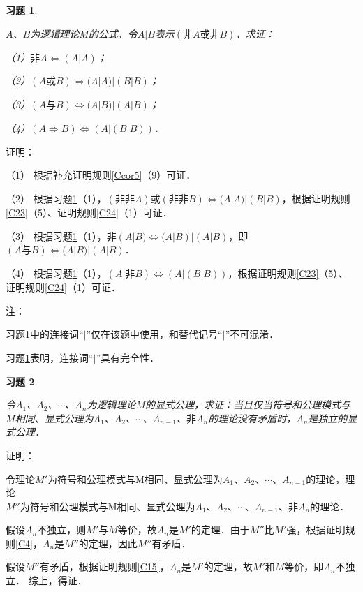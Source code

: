 \documentclass[12pt, a4paper, oneside]{book}
\newtheorem{exer}{习题}
\begin{document}
			\begin{exer}\label{exer11}
				\hfill\par
				$A$、$B$为逻辑理论$M$的公式，令$A|B$表示$(\text{非}A\text{或}\text{非}B)$，求证：
				\par
				（1）$\text{非}A\Leftrightarrow (A|A)$；
				\par
				（2）$(A\text{或}B)\Leftrightarrow (A|A)|(B|B)$；
				\par
				（3）$(A\text{与}B)\Leftrightarrow (A|B)|(A|B)$；
				\par
				（4）$(A\Rightarrow B)\Leftrightarrow (A|(B|B))$．
			\end{exer}
			证明：
			\par
			（1）	根据补充证明规则\ref{Ccor5}（9）可证．
			\par
			（2）	根据习题\ref{exer11}（1），$(\text{非}\text{非}A)\text{或}(\text{非}\text{非}B)\Leftrightarrow (A|A)|(B|B)$，根据证明规则\ref{C23}（5）、证明规则\ref{C24}（1）可证．
			\par
			（3）	根据习题\ref{exer11}（1），$\text{非}(A|B)\Leftrightarrow (A|B)|(A|B)$，即$(A\text{与}B)\Leftrightarrow (A|B)|(A|B)$．
			\par
			（4）	根据习题\ref{exer11}（1），$(A|\text{非}B)\Leftrightarrow (A|(B|B))$，根据证明规则\ref{C23}（5）、证明规则\ref{C24}（1）可证．
			\par
			注：
			\par
			习题\ref{exer11}中的连接词“$|$”仅在该题中使用，和替代记号“$|$”不可混淆．
			\par
			习题\ref{exer11}表明，连接词“$|$”具有完全性．	
	
			\begin{exer}\label{exer12}
				\hfill\par
				令$A_1$、$A_2$、$\cdots$、$A_n$为逻辑理论$M$的显式公理，求证：当且仅当符号和公理模式与$M$相同、显式公理为$A_1$、$A_2$、$\cdots$、$A_{n-1}$、$\text{非}A_n$的理论没有矛盾时，$A_n$是独立的显式公理．
			\end{exer}			
			证明：
			\par
			令理论$M'$为符号和公理模式与M相同、显式公理为$A_1$、$A_2$、$\cdots$、$A_{n-1}$的理论，理论\\$M''$为符号和公理模式与M相同、显式公理为$A_1$、$A_2$、$\cdots$、$A_{n-1}$、$\text{非}A_n$的理论．
			\par
			假设$A_n$不独立，则$M'$与$M$等价，故$A_n$是$M'$的定理．由于$M''$比$M'$强，根据证明规则\ref{C4}，$A_n$是$M''$的定理，因此$M''$有矛盾．
			\par
			假设$M''$有矛盾，根据证明规则\ref{C15}，$A_n$是$M'$的定理，故$M'$和$M$等价，即$A_n$不独立．
			综上，得证．
			
\end{document}
